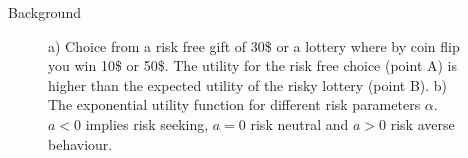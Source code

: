 \begin{exampleblock}{Background}
\begin{figure}[htp]
\quad
{}

\caption{a) Choice from a risk free gift of 30\$ or a lottery where by coin flip you win 10\$ or 50\$. The utility for the risk free choice (point A) is higher than the expected utility of the risky lottery (point B). b) The exponential utility function for different risk parameters $\alpha$. $a < 0$ implies risk seeking, $a = 0 $ risk neutral and $a > 0 $ risk averse behaviour.}


\end{figure}
\end{exampleblock}

